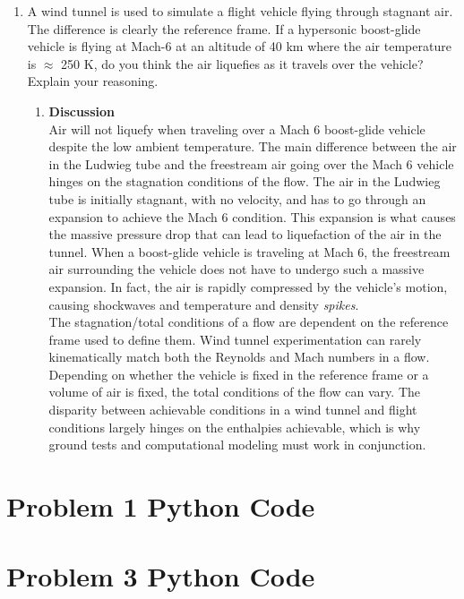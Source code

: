 \documentclass[12pt,letterpaper]{article}
\begin{document}
\begin{enumerate}[label=(\alph*)]
			\item A wind tunnel is used to simulate a flight vehicle flying through stagnant air. The
			difference is clearly the reference frame. If a hypersonic boost-glide vehicle is flying at Mach-6 at an altitude of 40 km where the air temperature is $\approx$ 250 K, do you think the air liquefies as it travels over the vehicle? Explain your reasoning.
		\begin{enumerate}[label=\arabic*.]
			\item{\textbf{Discussion}}\\
			 Air will not liquefy when traveling over a Mach 6 boost-glide vehicle despite the low ambient temperature. 
			 The main difference between the air in the Ludwieg tube and the freestream air going over the Mach 6 vehicle hinges on the stagnation conditions of the flow.
			 The air in the Ludwieg tube is initially stagnant, with no velocity, and has to go through an expansion to achieve the Mach 6 condition.
			 This expansion is what causes the massive pressure drop that can lead to liquefaction of the air in the tunnel. 
			 When a boost-glide vehicle is traveling at Mach 6, the freestream air surrounding the vehicle does not have to undergo such a massive expansion.
			 In fact, the air is rapidly compressed by the vehicle's motion, causing shockwaves and temperature and density \textit{spikes}. \\
			 The stagnation/total conditions of a flow are dependent on the reference frame used to define them. 
			 Wind tunnel experimentation can rarely kinematically match both the Reynolds and Mach numbers in a flow.
			 Depending on whether the vehicle is fixed in the reference frame or a volume of air is fixed, the total conditions of the flow can vary.
			 The disparity between achievable conditions in a wind tunnel and flight conditions largely hinges on the enthalpies achievable, which is why ground tests and computational modeling must work in conjunction.
			  
			
		\end{enumerate}
	\end{enumerate}

	\newpage
	
	\begin{appendices}
		\section{Problem 1 Python Code}
		\label{Problem1Python}
		
		\newpage

		\section{Problem 3 Python Code}
		\label{Problem3Python}

		
		\newpage
	\end{appendices}
	
	
	
\end{document}
